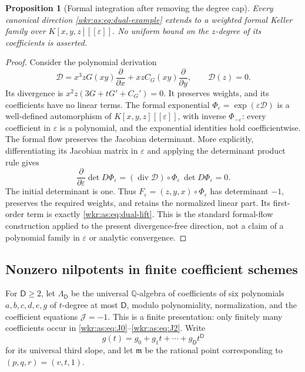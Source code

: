 \documentclass[11pt,a4paper]{article}
\numberwithin{equation}{section}
\newtheorem{proposition}[theorem]{Proposition}
\theoremstyle{definition}
\theoremstyle{remark}
\newcommand{\Q}{\mathbb{Q}}
\newcommand{\J}{\mathcal{J}}
\newcommand{\eps}{\varepsilon}
\newcommand{\Dcap}{\mathsf D}
\begin{document}
\begin{proposition}[Formal integration after removing the degree cap]
\label{wkr:as:prop:formalflow}
Every canonical direction \eqref{wkr:as:eq:dual-example} extends to a
weighted formal Keller family over $K[x,y,z][[\eps]]$. No uniform bound
on the $z$-degree of its coefficients is asserted.
\end{proposition}
\begin{proof}
Consider the polynomial derivation
\[
\mathcal D=x^3zG(xy)\frac{\partial}{\partial x}
          +xzC_G(xy)\frac{\partial}{\partial y},\qquad \mathcal D(z)=0.
\]
Its divergence is $x^2z(3G+tG'+C_G')=0$. It preserves weights, and its
coefficients have no linear terms. The formal exponential
$\Phi_\eps=\exp(\eps\mathcal D)$ is a well-defined automorphism of
$K[x,y,z][[\eps]]$, with inverse $\Phi_{-\eps}$: every coefficient in
$\eps$ is a polynomial, and the exponential identities hold
coefficientwise. The formal flow preserves the Jacobian determinant. More
explicitly, differentiating its Jacobian matrix in $\eps$ and applying
the determinant product rule gives
\[
\frac{\partial}{\partial\eps}\det D\Phi_\eps
  = (\operatorname{div}\mathcal D)\circ\Phi_\eps\,
    \det D\Phi_\eps=0.
\]
The initial determinant is one. Thus
$F_\eps=(z,y,x)\circ\Phi_\eps$ has determinant $-1$, preserves the
required weights, and retains the normalized linear part. Its first-order
term is exactly \eqref{wkr:as:eq:dual-lift}. This is the standard
formal-flow construction applied to the present divergence-free
direction, not a claim of a polynomial family in $\eps$ or analytic
convergence.
\end{proof}

\subsection{Nonzero nilpotents in finite coefficient schemes}

For $\Dcap\ge2$, let $\Lambda_{\Dcap}$ be the universal $\Q$-algebra of
coefficients of six polynomials $a,b,c,d,e,g$ of $t$-degree at most
$\Dcap$, modulo polynomiality, normalization, and the coefficient
equations $\J=-1$. This is a finite presentation: only finitely many
coefficients occur in \eqref{wkr:as:eq:J0}--\eqref{wkr:as:eq:J2}. Write
\[
g(t)=g_0+g_1t+\cdots+g_{\Dcap}t^{\Dcap}
\]
for its universal third slope, and let $\mathfrak m$ be the rational
point corresponding to $(p,q,r)=(v,t,1)$.
\end{document}
